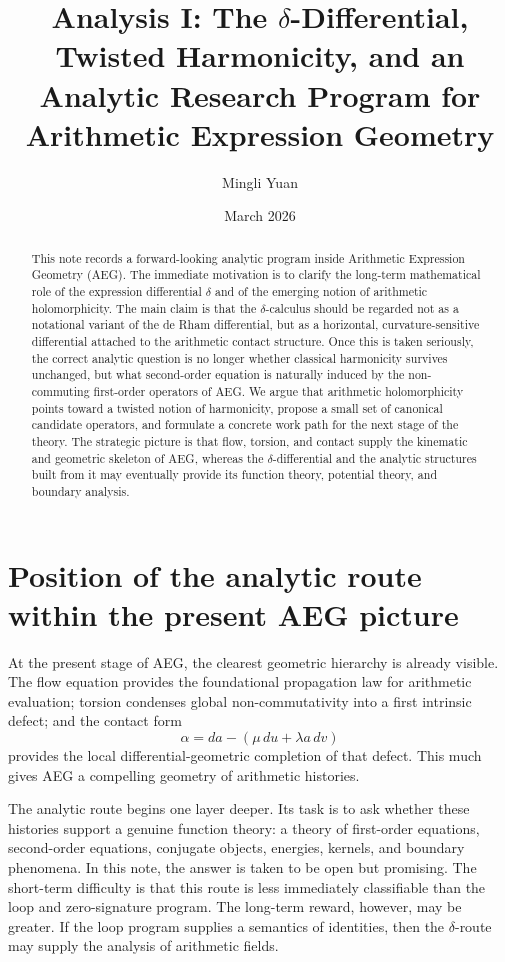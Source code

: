 \documentclass[11pt]{article}
\title{\textbf{Analysis I: The $\delta$-Differential, Twisted Harmonicity, and an Analytic Research Program for Arithmetic Expression Geometry}}
\author{Mingli Yuan}
\date{March 2026}
\newcommand{\AEG}{AEG}
\begin{document}
\maketitle

\begin{abstract}
This note records a forward-looking analytic program inside Arithmetic Expression Geometry (\AEG). The immediate motivation is to clarify the long-term mathematical role of the expression differential $\delta$ and of the emerging notion of arithmetic holomorphicity. The main claim is that the $\delta$-calculus should be regarded not as a notational variant of the de Rham differential, but as a horizontal, curvature-sensitive differential attached to the arithmetic contact structure. Once this is taken seriously, the correct analytic question is no longer whether classical harmonicity survives unchanged, but what second-order equation is naturally induced by the non-commuting first-order operators of \AEG. We argue that arithmetic holomorphicity points toward a twisted notion of harmonicity, propose a small set of canonical candidate operators, and formulate a concrete work path for the next stage of the theory. The strategic picture is that flow, torsion, and contact supply the kinematic and geometric skeleton of \AEG, whereas the $\delta$-differential and the analytic structures built from it may eventually provide its function theory, potential theory, and boundary analysis.
\end{abstract}

\section{Position of the analytic route within the present \AEG{} picture}

At the present stage of \AEG, the clearest geometric hierarchy is already visible. The flow equation provides the foundational propagation law for arithmetic evaluation; torsion condenses global non-commutativity into a first intrinsic defect; and the contact form
\begin{equation}
\alpha = da - (\mu\,du + \lambda a\,dv)
\end{equation}
provides the local differential-geometric completion of that defect. This much gives \AEG{} a compelling geometry of arithmetic histories.

The analytic route begins one layer deeper. Its task is to ask whether these histories support a genuine function theory: a theory of first-order equations, second-order equations, conjugate objects, energies, kernels, and boundary phenomena. In this note, the answer is taken to be open but promising. The short-term difficulty is that this route is less immediately classifiable than the loop and zero-signature program. The long-term reward, however, may be greater. If the loop program supplies a semantics of identities, then the $\delta$-route may supply the analysis of arithmetic fields.
\end{document}
